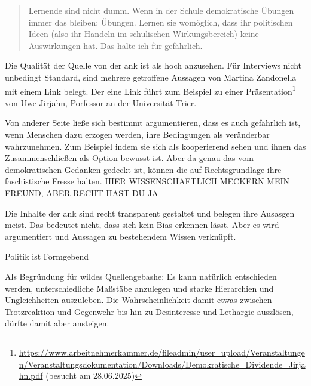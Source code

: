 \begin{quote}
    Lernende sind nicht dumm. Wenn in der Schule demokratische Übungen immer das bleiben: Übungen. Lernen sie womöglich, dass ihr politischen Ideen (also ihr Handeln im schulischen Wirkungsbereich) keine Auswirkungen hat. Das halte ich für gefährlich.
\end{quote}











Die Qualität der Quelle von der \gls{ank} ist als hoch anzusehen. Für Interviews nicht unbedingt Standard, sind mehrere getroffene Aussagen von Martina Zandonella mit einem Link belegt. Der eine Link führt zum Beispiel zu einer Präsentation\footnote{
    \url{https://www.arbeitnehmerkammer.de/fileadmin/user_upload/Veranstaltungen/Veranstaltungsdokumentation/Downloads/Demokratische_Dividende_Jirjahn.pdf} (besucht am 28.06.2025)
} von Uwe Jirjahn, Porfessor an der Universität Trier.






Von anderer Seite ließe sich bestimmt argumentieren, dass es auch gefährlich ist, wenn Menschen dazu erzogen werden, ihre Bedingungen als veränderbar wahrzunehmen. Zum Beispiel indem sie sich als kooperierend sehen und ihnen das Zusammenschließen als Option bewusst ist.
Aber da genau das vom demokratischen Gedanken gedeckt ist, können die auf Rechtsgrundlage ihre faschistische Fresse halten. HIER WISSENSCHAFTLICH MECKERN MEIN FREUND, ABER RECHT HAST DU JA





Die Inhalte der \gls{ank} sind recht transparent gestaltet und belegen ihre Ausasgen meist. Das bedeutet nicht, dass sich kein Bias erkennen lässt. Aber es wird argumentiert und Aussagen zu bestehendem Wissen verknüpft. 
\bigskip

Politik ist Formgebend








Als Begründung für wildes Quellengebashe:
Es kann natürlich entschieden werden, unterschiedliche Maßstäbe anzulegen und starke Hierarchien und Ungleichheiten auszuleben. Die Wahrscheinlichkeit damit etwas zwischen Trotzreaktion und Gegenwehr bis hin zu Desinteresse und Lethargie auszlösen, dürfte damit aber ansteigen. 

